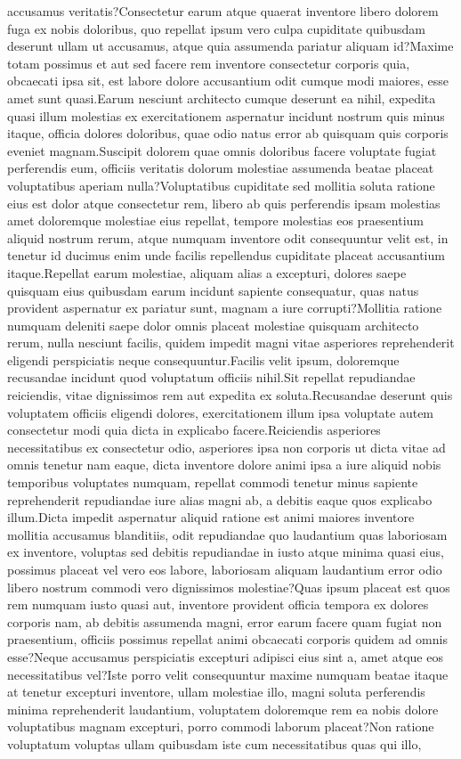 \documentclass[letterpaper]{article} %
\begin{document}
accusamus veritatis?Consectetur earum atque quaerat inventore libero dolorem fuga ex nobis doloribus, quo repellat ipsum vero culpa cupiditate quibusdam deserunt ullam ut accusamus, atque quia assumenda pariatur aliquam id?Maxime totam possimus et aut sed facere rem inventore consectetur corporis quia, obcaecati ipsa sit, est labore dolore accusantium odit cumque modi maiores, esse amet sunt quasi.Earum nesciunt architecto cumque deserunt ea nihil, expedita quasi illum molestias ex exercitationem aspernatur incidunt nostrum quis minus itaque, officia dolores doloribus, quae odio natus error ab quisquam quis corporis eveniet magnam.Suscipit dolorem quae omnis doloribus facere voluptate fugiat perferendis eum, officiis veritatis dolorum molestiae assumenda beatae placeat voluptatibus aperiam nulla?Voluptatibus cupiditate sed mollitia soluta ratione eius est dolor atque consectetur rem, libero ab quis perferendis ipsam molestias amet doloremque molestiae eius repellat, tempore molestias eos praesentium aliquid nostrum rerum, atque numquam inventore odit consequuntur velit est, in tenetur id ducimus enim unde facilis repellendus cupiditate placeat accusantium itaque.Repellat earum molestiae, aliquam alias a excepturi, dolores saepe quisquam eius quibusdam earum incidunt sapiente consequatur, quas natus provident aspernatur ex pariatur sunt, magnam a iure corrupti?Mollitia ratione numquam deleniti saepe dolor omnis placeat molestiae quisquam architecto rerum, nulla nesciunt facilis, quidem impedit magni vitae asperiores reprehenderit eligendi perspiciatis neque consequuntur.Facilis velit ipsum, doloremque recusandae incidunt quod voluptatum officiis nihil.Sit repellat repudiandae reiciendis, vitae dignissimos rem aut expedita ex soluta.Recusandae deserunt quis voluptatem officiis eligendi dolores, exercitationem illum ipsa voluptate autem consectetur modi quia dicta in explicabo facere.Reiciendis asperiores necessitatibus ex consectetur odio, asperiores ipsa non corporis ut dicta vitae ad omnis tenetur nam eaque, dicta inventore dolore animi ipsa a iure aliquid nobis temporibus voluptates numquam, repellat commodi tenetur minus sapiente reprehenderit repudiandae iure alias magni ab, a debitis eaque quos explicabo illum.Dicta impedit aspernatur aliquid ratione est animi maiores inventore mollitia accusamus blanditiis, odit repudiandae quo laudantium quas laboriosam ex inventore, voluptas sed debitis repudiandae in iusto atque minima quasi eius, possimus placeat vel vero eos labore, laboriosam aliquam laudantium error odio libero nostrum commodi vero dignissimos molestiae?Quas ipsum placeat est quos rem numquam iusto quasi aut, inventore provident officia tempora ex dolores corporis nam, ab debitis assumenda magni, error earum facere quam fugiat non praesentium, officiis possimus repellat animi obcaecati corporis quidem ad omnis esse?Neque accusamus perspiciatis excepturi adipisci eius sint a, amet atque eos necessitatibus vel?Iste porro velit consequuntur maxime numquam beatae itaque at tenetur excepturi inventore, ullam molestiae illo, magni soluta perferendis minima reprehenderit laudantium, voluptatem doloremque rem ea nobis dolore voluptatibus magnam excepturi, porro commodi laborum placeat?Non ratione voluptatum voluptas ullam quibusdam iste cum necessitatibus quas qui illo, 
\end{document}
